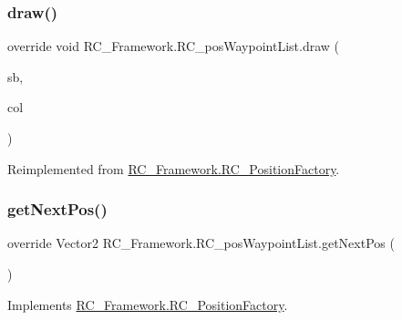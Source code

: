 \subsubsection{\texorpdfstring{draw()}{draw()}}
{\footnotesize\ttfamily override void R\+C\+\_\+\+Framework.\+R\+C\+\_\+pos\+Waypoint\+List.\+draw (\begin{DoxyParamCaption}\item[{Sprite\+Batch}]{sb,  }\item[{Color}]{col }\end{DoxyParamCaption})\hspace{0.3cm}{\ttfamily [virtual]}}



Reimplemented from \mbox{\hyperlink{class_r_c___framework_1_1_r_c___position_factory_a39eaa0f4f1dfd07225b4880d494d81fa}{R\+C\+\_\+\+Framework.\+R\+C\+\_\+\+Position\+Factory}}.

\mbox{\label{class_r_c___framework_1_1_r_c__pos_waypoint_list_a2f91d419c6513795cae3464fda807450}} 
\subsubsection{\texorpdfstring{get\+Next\+Pos()}{getNextPos()}}
{\footnotesize\ttfamily override Vector2 R\+C\+\_\+\+Framework.\+R\+C\+\_\+pos\+Waypoint\+List.\+get\+Next\+Pos (\begin{DoxyParamCaption}{ }\end{DoxyParamCaption})\hspace{0.3cm}{\ttfamily [virtual]}}



Implements \mbox{\hyperlink{class_r_c___framework_1_1_r_c___position_factory_aab6cd4cb6a10c8dfa126c4930c6a9fbf}{R\+C\+\_\+\+Framework.\+R\+C\+\_\+\+Position\+Factory}}.

\mbox{\label{class_r_c___framework_1_1_r_c__pos_waypoint_list_a9bd29086f89fd9b6ad534dbf1d2785ab}} 

